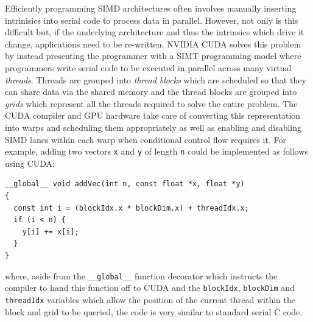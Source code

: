 \documentclass[utf8]{frontiersSCNS} %
\begin{document}
Efficiently programming SIMD architectures often involves manually inserting intrinisics into serial code to process data in parallel.
However, not only is this difficult but, if the underlying architecture and thus the intrinsics which drive it change, applications need to be re-written.
NVIDIA CUDA solves this problem by instead presenting the programmer with a SIMT programming model where programmers write serial code to be executed in parallel across many virtual \textit{threads}.
Threads are grouped into \textit{thread blocks} which are scheduled so that they can share data via the shared memory and the thread blocks are grouped into \textit{grids} which represent all the threads required to solve the entire problem.
The CUDA compiler and GPU hardware take care of converting this representation into warps and scheduling them appropriately as well as enabling and disabling SIMD lanes within each warp when conditional control flow requires it.
For example, adding two vectors \lstinline{x} and \lstinline{y} of length \lstinline{n} could be implemented as follows using CUDA:
\begin{lstlisting}
__global__ void addVec(int n, const float *x, float *y)
{
  const int i = (blockIdx.x * blockDim.x) + threadIdx.x;
  if (i < n) {
    y[i] += x[i];
  }
}
\end{lstlisting}
where, aside from the \lstinline{__global__} function decorator which instructs the compiler to hand this function off to CUDA and the \lstinline{blockIdx}, \lstinline{blockDim} and \lstinline{threadIdx} variables which allow the position of the current thread within the block and grid to be queried, the code is very similar to standard serial C code.
\end{document}
